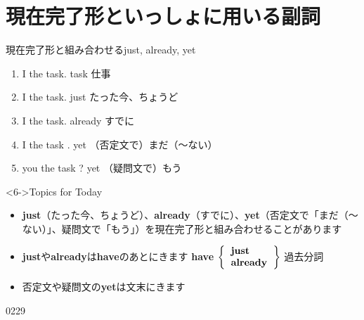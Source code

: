 \documentclass[aspectratio=169,xcolor={dvipsnames,table}]{beamer}
\newcommand{\myaudio}[1]{\href{#1}{\faVolumeUp}}
\begin{document}
\section{現在完了形といっしょに用いる副詞}
\begin{frame}[plain,t]{現在完了形と組み合わせるjust, already, yet}
\begin{enumerate}
 \item<1-> I  the task.%
\hfill{}{\scriptsize task  仕事}
 \item<2-> I    the task.%
\hfill{}{\scriptsize just  たった今、ちょうど}
 \item<3-> I    the task.%
\hfill{}{\scriptsize already  すでに}
 \item<4-> I    the task .%
\hfill{}{\scriptsize yet  （否定文で）まだ（～ない）}
 \item<5->  you  the task ?%
\hfill{}{\scriptsize yet  （疑問文で）もう}
\end{enumerate}

\bigskip

 \begin{block}<6->{Topics for Today}
\small
\begin{itemize}[square]\small
 \item<6-> \textbf{just}（たった今、ちょうど）、\textbf{already}（すでに）、\textbf{yet}（否定文で「まだ（～ない）」、疑問文で「もう」）を現在完了形と組み合わせることがあります
 \item<7-> \textbf{just}や\textbf{already}は\textbf{have}のあとにきます%
\hspace{70pt}\textbf{have} $\left\{
       \begin{tabular}{l}
	\textbf{just}\\
	\textbf{already}
       \end{tabular}
\right\}$ 過去分詞
 \item<8-> 否定文や疑問文の\textbf{yet}は文末にきます
\end{itemize}
      \end{block}

\vspace{-10pt}

\hfill{\scriptsize 0229}\,{\scriptsize \myaudio{./audio/014_have_pp_kekka_05b.mp3}}

\end{frame}
\end{document}
